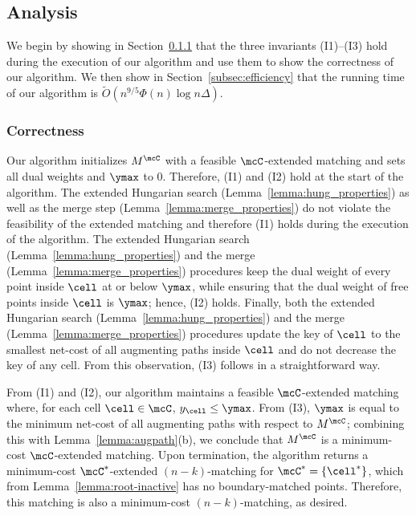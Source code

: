 \subsection{Analysis}\label{subsec:geometric-analysis}

We begin by showing in Section~\ref{sec:correctness} that the three invariants (I1)--(I3) hold during the execution of our algorithm and use them to show the correctness of our algorithm. We then show in Section~\ref{subsec:efficiency} that the running time of our algorithm is $\tilde{O}(n^{9/5}\Phi(n)\log n\Delta)$.





\subsubsection{Correctness}\label{sec:correctness}

Our algorithm initializes $M^{\mcC}$ with a feasible $\mcC$-extended matching and sets all dual weights and $\ymax$ to $0$. Therefore, (I1) and (I2) hold at the start of the algorithm. The extended Hungarian search (Lemma~\ref{lemma:hung_properties}) as well as the merge step (Lemma~\ref{lemma:merge_properties}) do not violate the feasibility of the extended matching and therefore (I1) holds during the execution of the algorithm. The extended Hungarian search (Lemma~\ref{lemma:hung_properties}) and the merge (Lemma~\ref{lemma:merge_properties}) procedures keep the dual weight of every point inside $\cell$ at or below $\ymax$, while ensuring that the dual weight of free points inside $\cell$ is $\ymax$; hence, (I2) holds. Finally, both the extended Hungarian search (Lemma~\ref{lemma:hung_properties}) and the merge (Lemma~\ref{lemma:merge_properties}) procedures update the key of $\cell$ to the smallest net-cost of all augmenting paths inside $\cell$ and do not decrease the key of any cell. From this observation, (I3) follows in a straightforward way.

From (I1) and (I2), our algorithm maintains a feasible $\mcC$-extended matching where, for each cell $\cell\in\mcC$, $y_\cell \le \ymax$. From (I3), $\ymax$ is equal to the minimum net-cost of all augmenting paths with respect to $M^{\mcC}$; combining this with Lemma~\ref{lemma:augpath}(b), we conclude that $M^{\mcC}$ is a minimum-cost $\mcC$-extended matching. Upon termination, the algorithm returns a minimum-cost $\mcC^*$-extended $(n-k)$-matching for $\mcC^*=\{\cell^*\}$, which from Lemma~\ref{lemma:root-inactive} has no boundary-matched points. Therefore, this matching is also a minimum-cost $(n-k)$-matching, as desired.




